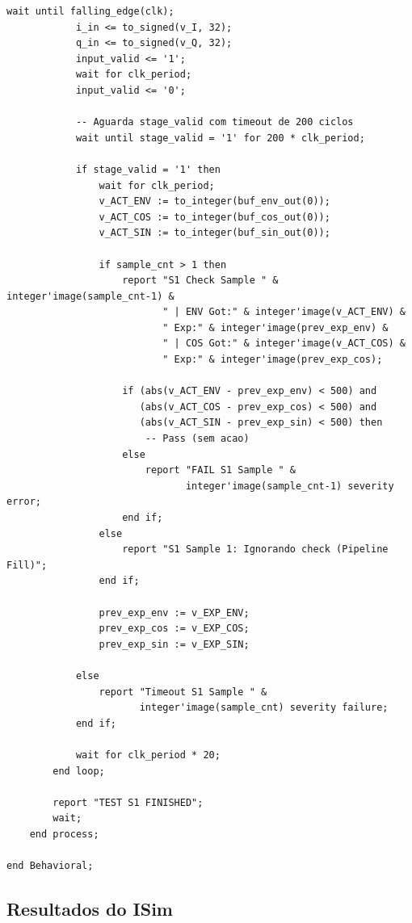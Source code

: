\documentclass[a4paper,12pt]{article}
\begin{document}
\begin{lstlisting}[style=vhdlstyle,
    caption={Testbench do \texttt{Top\_NeuralNet\_S1} com leitura de arquivo de vetores.},
    label={lst:top_s1_tb}]
            wait until falling_edge(clk);
            i_in <= to_signed(v_I, 32);
            q_in <= to_signed(v_Q, 32);
            input_valid <= '1';
            wait for clk_period;
            input_valid <= '0';

            -- Aguarda stage_valid com timeout de 200 ciclos
            wait until stage_valid = '1' for 200 * clk_period;

            if stage_valid = '1' then
                wait for clk_period;
                v_ACT_ENV := to_integer(buf_env_out(0));
                v_ACT_COS := to_integer(buf_cos_out(0));
                v_ACT_SIN := to_integer(buf_sin_out(0));

                if sample_cnt > 1 then
                    report "S1 Check Sample " & integer'image(sample_cnt-1) &
                           " | ENV Got:" & integer'image(v_ACT_ENV) &
                           " Exp:" & integer'image(prev_exp_env) &
                           " | COS Got:" & integer'image(v_ACT_COS) &
                           " Exp:" & integer'image(prev_exp_cos);

                    if (abs(v_ACT_ENV - prev_exp_env) < 500) and
                       (abs(v_ACT_COS - prev_exp_cos) < 500) and
                       (abs(v_ACT_SIN - prev_exp_sin) < 500) then
                        -- Pass (sem acao)
                    else
                        report "FAIL S1 Sample " &
                               integer'image(sample_cnt-1) severity error;
                    end if;
                else
                    report "S1 Sample 1: Ignorando check (Pipeline Fill)";
                end if;

                prev_exp_env := v_EXP_ENV;
                prev_exp_cos := v_EXP_COS;
                prev_exp_sin := v_EXP_SIN;

            else
                report "Timeout S1 Sample " &
                       integer'image(sample_cnt) severity failure;
            end if;

            wait for clk_period * 20;
        end loop;

        report "TEST S1 FINISHED";
        wait;
    end process;

end Behavioral;
\end{lstlisting}

\subsection{Resultados do ISim}
\end{document}
